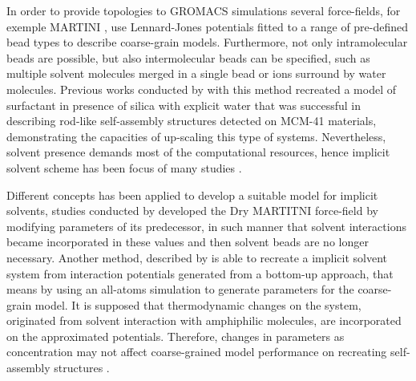 \documentclass[10pt,a4paper,twoside]{article}
\begin{document}
In order to provide topologies to GROMACS simulations several force-fields, for exemple MARTINI \cite{martini}, use Lennard-Jones potentials fitted to a range of pre-defined bead types to describe coarse-grain models. Furthermore, not only intramolecular beads are possible, but also intermolecular beads can be specified, such as multiple solvent molecules merged in a single bead or ions surround by water molecules. Previous works conducted by \cite{mjsilica} with this method recreated a model of surfactant in presence of silica with explicit water that was successful in describing rod-like self-assembly structures detected on MCM-41 materials, demonstrating the capacities of up-scaling this type of systems. Nevertheless, solvent presence demands most of the computational resources, hence  implicit solvent scheme has been focus of many studies \cite{gromacs}.

Different concepts has been applied to develop a suitable model for implicit solvents, studies conducted by  developed the Dry MARTITNI force-field by modifying parameters of its predecessor, in such manner that solvent interactions became incorporated in these values and then solvent beads are no longer necessary. Another method, described by \cite{magic} is able to recreate a implicit solvent system from interaction potentials generated from a bottom-up approach, that means by using an all-atoms simulation to generate parameters for the coarse-grain model. It is supposed  that thermodynamic changes on the system, originated from solvent interaction with amphiphilic molecules, are incorporated on the approximated potentials. Therefore, changes in parameters as concentration may not affect coarse-grained model performance on recreating self-assembly structures \cite{dmpc}.
\end{document}
